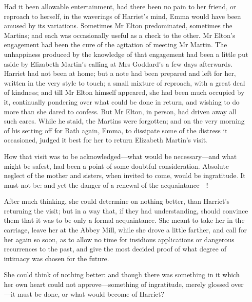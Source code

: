 Had it been allowable entertainment, had there been no pain to her friend, or reproach to herself, in the waverings of Harriet's mind, Emma would have been amused by its variations. Sometimes Mr Elton predominated, sometimes the Martins; and each was occasionally useful as a check to the other. Mr Elton's engagement had been the cure of the agitation of meeting Mr Martin. The unhappiness produced by the knowledge of that engagement had been a little put aside by Elizabeth Martin's calling at Mrs Goddard's a few days afterwards. Harriet had not been at home; but a note had been prepared and left for her, written in the very style to touch; a small mixture of reproach, with a great deal of kindness; and till Mr Elton himself appeared, she had been much occupied by it, continually pondering over what could be done in return, and wishing to do more than she dared to confess. But Mr Elton, in person, had driven away all such cares. While he staid, the Martins were forgotten; and on the very morning of his setting off for Bath again, Emma, to dissipate some of the distress it occasioned, judged it best for her to return Elizabeth Martin's visit.

How that visit was to be acknowledged—what would be necessary—and what might be safest, had been a point of some doubtful consideration. Absolute neglect of the mother and sisters, when invited to come, would be ingratitude. It must not be: and yet the danger of a renewal of the acquaintance—!

After much thinking, she could determine on nothing better, than Harriet's returning the visit; but in a way that, if they had understanding, should convince them that it was to be only a formal acquaintance. She meant to take her in the carriage, leave her at the Abbey Mill, while she drove a little farther, and call for her again so soon, as to allow no time for insidious applications or dangerous recurrences to the past, and give the most decided proof of what degree of intimacy was chosen for the future.

She could think of nothing better: and though there was something in it which her own heart could not approve—something of ingratitude, merely glossed over—it must be done, or what would become of Harriet?
